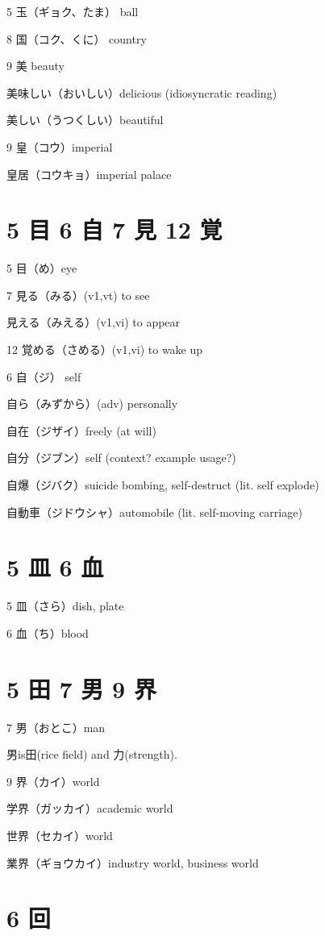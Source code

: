 5 玉（ギョク、たま） ball

8 国（コク、くに） country

9 美 beauty

美味しい（おいしい）delicious (idiosyncratic reading)

美しい（うつくしい）beautiful

9 皇（コウ）imperial

皇居（コウキョ）imperial palace

\section{5 目 6 自 7 見 12 覚}

5 目（め）eye

7 見る（みる）(v1,vt) to see

見える（みえる）(v1,vi) to appear

12 覚める（さめる）(v1,vi) to wake up

6 自（ジ） self

自ら（みずから）(adv) personally

自在（ジザイ）freely (at will)

自分（ジブン）self (context? example usage?)

自爆（ジバク）suicide bombing, self-destruct (lit. self explode)

自動車（ジドウシャ）automobile (lit. self-moving carriage)

\section{5 皿 6 血}

5 皿（さら）dish, plate

6 血（ち）blood

\section{5 田 7 男 9 界}

7 男（おとこ）man

男is田(rice field) and 力(strength).

9 界（カイ）world

学界（ガッカイ）academic world

世界（セカイ）world

業界（ギョウカイ）industry world, business world

\section{6 回}

